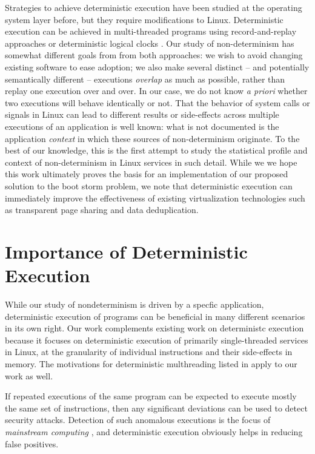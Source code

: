 Strategies to achieve deterministic execution have been studied at the operating system layer \cite{bergan2010dos} before,
but they require modifications to Linux. Deterministic execution can be achieved in multi-threaded programs 
using record-and-replay approaches \cite{patil2010pinplay} or deterministic logical clocks \cite{marek2011scaling}. 
Our study of non-determinism has somewhat different goals from from both approaches: we wish to avoid changing existing 
software to ease adoption; we also make several distinct -- and potentially semantically different -- executions \emph{overlap} as much as possible, 
rather than replay one execution over and over. In our case, we do not know \emph{a priori} whether two executions 
will behave identically or not. That the behavior of system calls or signals in Linux can lead to different results or side-effects across
multiple executions of an application is well known: what is not documented is the application \emph{context} in
which these sources of non-determinism originate. To the best of our knowledge, this is
the first attempt to study the statistical profile and context of non-determinism in Linux services
in such detail. While we we hope
this work ultimately proves the basis for an implementation of our proposed solution to the boot storm
problem, we note that deterministic execution can immediately improve
the effectiveness of existing virtualization technologies such as transparent page sharing
and data deduplication.

\section{Importance of Deterministic Execution}
While our study of nondeterminism is driven by a specfic application,
deterministic execution of programs can be beneficial in many
different scenarios in its own right. Our work complements existing
work on deterministc execution because 
it focuses on deterministic execution of primarily single-threaded services in Linux,
at the granularity of individual instructions and their side-effects in
memory. The motivations for deterministic multhreading listed in
\cite{marek2011scaling, patil2010pinplay} apply to our work as well. \newline

If repeated executions of the same program can be
expected to execute mostly the same set of instructions, then
any significant deviations can be used to detect security
attacks. Detection of such
anomalous executions is the focus of \emph{mainstream computing} \cite{stephenson2010mainstream},
and deterministic execution obviously helps in reducing false positives. \newline

